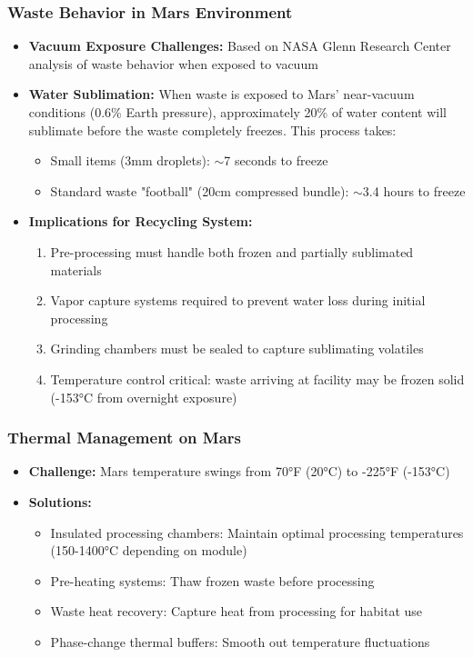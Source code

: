 \documentclass[12pt, a4paper]{article}
\begin{document}
\subsubsection{Waste Behavior in Mars Environment}
\begin{itemize}
    \item \textbf{Vacuum Exposure Challenges:} Based on NASA Glenn Research Center analysis of waste behavior when exposed to vacuum
    \item \textbf{Water Sublimation:} When waste is exposed to Mars' near-vacuum conditions (0.6\% Earth pressure), approximately 20\% of water content will sublimate before the waste completely freezes. This process takes:
    \begin{itemize}
        \item Small items (3mm droplets): $\sim$7 seconds to freeze
        \item Standard waste "football" (20cm compressed bundle): $\sim$3.4 hours to freeze
    \end{itemize}
    \item \textbf{Implications for Recycling System:}
    \begin{enumerate}
        \item Pre-processing must handle both frozen and partially sublimated materials
        \item Vapor capture systems required to prevent water loss during initial processing
        \item Grinding chambers must be sealed to capture sublimating volatiles
        \item Temperature control critical: waste arriving at facility may be frozen solid (-153°C from overnight exposure)
    \end{enumerate}
\end{itemize}

\subsubsection{Thermal Management on Mars}
\begin{itemize}
    \item \textbf{Challenge:} Mars temperature swings from 70°F (20°C) to -225°F (-153°C)
    \item \textbf{Solutions:}
    \begin{itemize}
        \item Insulated processing chambers: Maintain optimal processing temperatures (150-1400°C depending on module)
        \item Pre-heating systems: Thaw frozen waste before processing
        \item Waste heat recovery: Capture heat from processing for habitat use
        \item Phase-change thermal buffers: Smooth out temperature fluctuations
    \end{itemize}
\end{itemize}
\end{document}
